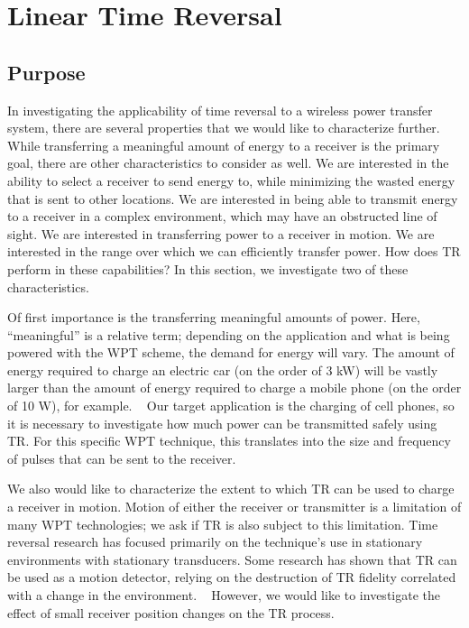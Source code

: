 \chapter{Linear Time Reversal}
\label{ch:ltr}

\section{Purpose}
\label{sec:ltr-purpose}

In investigating the applicability of time reversal to a wireless power transfer system, there are several properties that we would like to characterize further. While transferring a meaningful amount of energy to a receiver is the primary goal, there are other characteristics to consider as well. We are interested in the ability to select a receiver to send energy to, while minimizing the wasted energy that is sent to other locations. We are interested in being able to transmit energy to a receiver in a complex environment, which may have an obstructed line of sight. We are interested in transferring power to a receiver in motion. We are interested in the range over which we can efficiently transfer power. How does TR perform in these capabilities? In this section, we investigate two of these characteristics.

Of first importance is the transferring meaningful amounts of power. Here, ``meaningful'' is a relative term; depending on the application and what is being powered with the WPT scheme, the demand for energy will vary. The amount of energy required to charge an electric car (on the order of 3 kW) will be vastly larger than the amount of energy required to charge a mobile phone (on the order of 10 W), for example. ~\cite{witricity2013subsea} Our target application is the charging of cell phones, so it is necessary to investigate how much power can be transmitted safely using TR. For this specific WPT technique, this translates into the size and frequency of pulses that can be sent to the receiver.

We also would like to characterize the extent to which TR can be used to charge a receiver in motion. Motion of either the receiver or transmitter is a limitation of many WPT technologies; we ask if TR is also subject to this limitation. Time reversal research has focused primarily on the technique's use in stationary environments with stationary transducers. Some research has shown that TR can be used as a motion detector, relying on the destruction of TR fidelity correlated with a change in the environment. ~\cite{taddese_sensing_2010} However, we would like to investigate the effect of small receiver position changes on the TR process.


